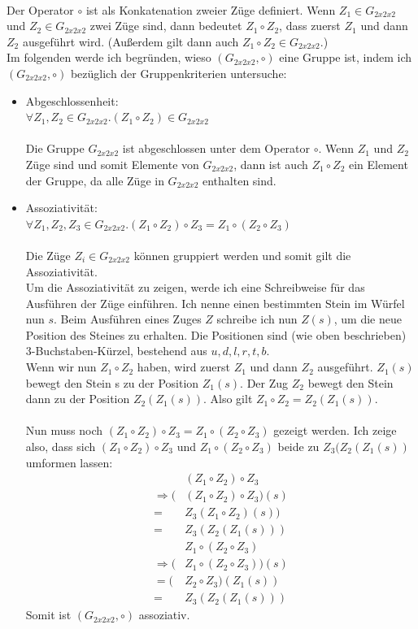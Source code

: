\documentclass[12pt,a4paper, usenames, dvipsnames]{article}
\begin{document}
\\
Der Operator $\circ$ ist als Konkatenation zweier Züge definiert. Wenn $Z_1 \in G_{2x2x2}$ und $Z_2 \in G_{2x2x2}$ zwei Züge sind, dann bedeutet $Z_1 \circ Z_2$, dass zuerst $Z_1$ und dann $Z_2$ ausgeführt wird. (Außerdem gilt dann auch $Z_1 \circ Z_2 \in G_{2x2x2}$.) \\
Im folgenden werde ich begründen, wieso $(G_{2x2x2}, \circ)$ eine Gruppe ist, indem ich $(G_{2x2x2}, \circ)$ bezüglich der Gruppenkriterien untersuche: \\
\begin{itemize}
\item Abgeschlossenheit: \\ 
$\forall Z_1,Z_2 \in G_{2x2x2} .  (Z_1 \circ Z_2) \in G_{2x2x2} $ \\
\\
Die Gruppe $G_{2x2x2}$ ist abgeschlossen unter dem Operator $\circ$. Wenn $Z_1 $ und $Z_2$ Züge sind und somit Elemente von $G_{2x2x2}$, dann ist auch $Z_1 \circ Z_2$ ein Element der Gruppe, da alle Züge in $G_{2x2x2}$ enthalten sind. 

\item Assoziativität:\\ 
$\forall Z_1,Z_2,Z_3 \in G_{2x2x2}.(Z_1 \circ Z_2) \circ Z_3 = Z_1 \circ (Z_2 \circ Z_3)$ \\
\\
Die Züge $Z_i \in G_{2x2x2}$ können gruppiert werden und somit gilt die Assoziativität. \\
Um die Assoziativität zu zeigen, werde ich eine Schreibweise für das Ausführen der Züge einführen. Ich nenne einen bestimmten Stein im Würfel nun $s$. Beim Ausführen eines Zuges $Z$ schreibe ich nun $Z(s)$, um die neue Position des Steines zu erhalten. Die Positionen sind (wie oben beschrieben) 3-Buchstaben-Kürzel, bestehend aus $u, d, l, r, t, b$. \\
Wenn wir nun $Z_1 \circ Z_2 $ haben, wird zuerst $Z_1$ und dann $Z_2$ ausgeführt. $Z_1(s)$ bewegt den Stein s zu der Position $Z_1(s)$. Der Zug $Z_2$ bewegt den Stein dann zu der Position $Z_2(Z_1(s))$. Also gilt $Z_1 \circ Z_2 = Z_2(Z_1(s))$. \\
\\
Nun muss noch $(Z_1 \circ Z_2) \circ Z_3 = Z_1 \circ (Z_2 \circ Z_3)$ gezeigt werden. Ich zeige also, dass sich $(Z_1 \circ Z_2) \circ Z_3$ und $Z_1 \circ (Z_2 \circ Z_3)$ beide zu $Z_3(Z_2(Z_1(s))$ umformen lassen: \\
\begin{align*}
& (Z_1 \circ Z_2) \circ Z_3  \\
\Rightarrow (&(Z_1 \circ Z_2) \circ Z_3)(s) \\
= & Z_3(Z_1 \circ Z_2)(s)) \\
= & Z_3(Z_2(Z_1(s)))  
\end{align*}
\begin{align*}
&Z_1 \circ (Z_2 \circ Z_3) \\
\Rightarrow (&Z_1 \circ (Z_2 \circ Z_3))(s) \\
= (&Z_2 \circ Z_3)(Z_1(s)) \\
= \ \ & Z_3(Z_2(Z_1(s)))  
\end{align*}
Somit ist $(G_{2x2x2}, \circ)$ assoziativ.


\end{itemize}
\end{document}
